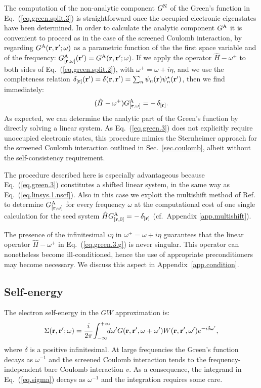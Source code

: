 \documentclass[twocolumn,prb,showpacs,superscriptaddress]{revtex4}
\def\w{\omega}
\def\wp{\omega^\prime}
\def\H{\hat{H}}
\def\r{{\bf r}}
\def\rp{{\bf r^\prime}}
\begin{document}
The computation of the non-analytic component $G^{\rm N}$ of the
Green's function in Eq.\ (\ref{eq.green.split.3}) is straightforward 
once the occupied electronic eigenstates have been determined.
In order to calculate the analytic component $G^{\rm A}$ it is convenient to
proceed as in the case of the screened Coulomb interaction,
by regarding $G^{\rm A}(\r,\rp;\w)$ as a parametric
function of the the first space variable and of the frequency:
$G^{\rm A}_{[\r,\w]}(\rp) = G^{\rm A}(\r,\rp;\w)$.
If we apply the operator $\H-\w^+$ to both sides of Eq.\ (\ref{eq.green.split.2}),
with $\w^+=\w+i\eta$,
and we use the completeness relation $\delta_{[\r]}(\rp) = \delta(\r,\rp) = \sum_n \psi_n(\r)\psi_n^\star(\rp)$, then we find immediately:
  \begin{equation}\label{eq.green.3}
  (\H-\w^+) G^{\rm A}_{[\r,\w]} = -\, \delta_{[\r]}.
  \end{equation}
As expected, we can determine the analytic part of the Green's function
by directly solving a linear system. As Eq.\ (\ref{eq.green.3}) 
does not explicitly require unoccupied electronic states, this procedure mimics 
the Sternheimer approach for the screened Coulomb interaction outlined in Sec.~\ref{sec.coulomb},
albeit without the self-consistency requirement.

The procedure described here is especially advantageous because Eq.\ (\ref{eq.green.3})
constitutes a shifted linear system, in the same way as Eq.\ (\ref{eq.linsys.1.nscf}).
Also in this case we exploit the multishift method of Ref.\ 
to determine $G^{\rm A}_{[\r,\w]}$ for every frequency $\w$
at the computational cost of one single calculation for the seed system $\H G^{\rm A}_{[\r,0]} = -\, \delta_{[\r]}$
(cf.\ Appendix \ref{app.multishift}).

The presence of the infinitesimal $i\eta$ in $\w^+=\w+i\eta$ 
guarantees that the linear operator $\H-\w^+$ in Eq.\ (\ref{eq.green.3.g}) is
never singular.
This operator can nonetheless become ill-conditioned, hence the use of appropriate
preconditioners may become necessary. We discuss this aspect 
in Appendix~\ref{app.condition}.

\subsection{Self-energy}\label{sec.sigma}

The electron self-energy in the $GW$ approximation is:\cite{hl86}
  \begin{equation} \label{eq.sigma}
  \Sigma(\r,\rp;\w) = \frac{i}{2\pi} \! \int_{-\infty}^{+\infty} \!\!\!\!d\wp 
    G(\r,\rp,\w+\wp) W(\r,\rp,\wp) e^{-i\delta\wp},
  \end{equation}
where $\delta$ is a positive infinitesimal. 
At large frequencies the Green's function decays as $\w^{-1}$ and 
the screened Coulomb interaction tends to the frequency-independent
bare Coulomb interaction $v$. As a consequence, the integrand in Eq.\ (\ref{eq.sigma}) 
decays as $\w^{-1}$ and the integration requires some care.
\end{document}
